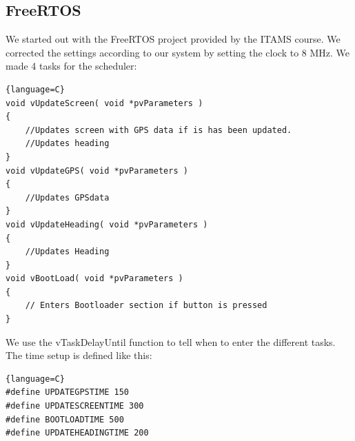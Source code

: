 \subsection{FreeRTOS}
We started out with the FreeRTOS project provided by the ITAMS course. We corrected the settings according to our system by setting the clock to 8 MHz.  We made 4 tasks for the scheduler:
\begin{lstlisting}{language=C}
void vUpdateScreen( void *pvParameters )
{
	//Updates screen with GPS data if is has been updated.
	//Updates heading
}
void vUpdateGPS( void *pvParameters )
{
	//Updates GPSdata
}
void vUpdateHeading( void *pvParameters )
{
	//Updates Heading
}
void vBootLoad( void *pvParameters )
{
	// Enters Bootloader section if button is pressed
}
\end{lstlisting}
We use the vTaskDelayUntil function to tell when to enter the different tasks. The time setup is defined like this:
\begin{lstlisting}{language=C}
#define UPDATEGPSTIME 150
#define UPDATESCREENTIME 300
#define BOOTLOADTIME 500
#define UPDATEHEADINGTIME 200
\end{lstlisting}



